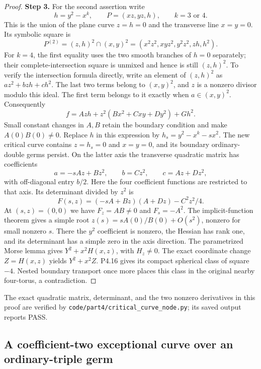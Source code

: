 \begin{proof}
\noindent\textbf{Step 3.} For the second assertion write
\[
 h=y^2-x^k,\qquad P=(xz,yz,h),\qquad k=3\text{ or }4.
\]
This is the union of the plane curve $z=h=0$ and the
transverse line $x=y=0$. Its symbolic square is
\[
 P^{(2)}=(z,h)^2\cap(x,y)^2
  =(x^2z^2,xyz^2,y^2z^2,zh,h^2).
\]
For $k=4$, the first equality uses the two smooth branches of
$h=0$ separately; their complete-intersection square is unmixed
and hence is still $(z,h)^2$. To verify the intersection
formula directly, write an element of $(z,h)^2$ as
$az^2+bzh+ch^2$. The last two terms belong to $(x,y)^2$,
and $z$ is a nonzero divisor modulo this ideal. The first term
belongs to it exactly when $a\in(x,y)^2$.
Consequently
\[
 f=Azh+z^2(Bx^2+Cxy+Dy^2)+Gh^2.
\]
Small constant changes in $A,B$ retain the boundary condition
and make $A(0)B(0)\ne0$. Replace $h$ in this expression by
$h_s=y^2-x^k-sx^2$. The new critical curve contains
$z=h_s=0$ and $x=y=0$, and its boundary ordinary-double
germs persist. On the latter axis the transverse quadratic
matrix has coefficients
\[
 a=-sAz+Bz^2,\qquad b=Cz^2,\qquad c=Az+Dz^2,
\]
with off-diagonal entry $b/2$. Here the four coefficient
functions are restricted to that axis. Its determinant
divided by $z^2$ is
\[
 F(s,z)=(-sA+Bz)(A+Dz)-C^2z^2/4.
\]
At $(s,z)=(0,0)$ we have $F_z=AB\ne0$ and
$F_s=-A^2$. The implicit-function theorem gives a simple root
$z(s)=sA(0)/B(0)+O(s^2)$, nonzero for small nonzero $s$.
There the $y^2$ coefficient is nonzero, the Hessian has rank
one, and its determinant has a simple zero in the axis
direction. The parametrized Morse lemma gives
$Y^2+x^2H(x,z)$, with $H_z\ne0$. The exact coordinate
change $Z=H(x,z)$ yields $Y^2+x^2Z$.
P4.16 gives its compact spherical class of square $-4$.
Nested boundary transport once more places this class in
the original nearby four-torus, a contradiction.
\end{proof}

The exact quadratic matrix, determinant, and the two nonzero
derivatives in this proof are verified by
\texttt{code/part4/critical\_curve\_node.py}; its saved output
reports PASS.


\subsection{A coefficient-two exceptional curve over an ordinary-triple germ}

